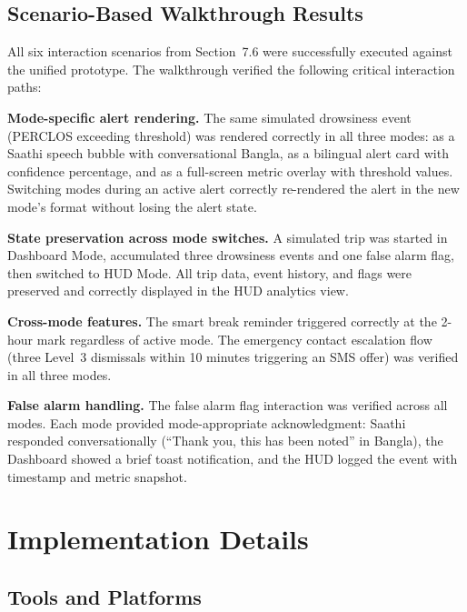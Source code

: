 \documentclass[sigconf]{acmart}
\begin{document}
\subsection{Scenario-Based Walkthrough Results}

All six interaction scenarios from Section~7.6 were successfully executed against the unified prototype. The walkthrough verified the following critical interaction paths:

\textbf{Mode-specific alert rendering.} The same simulated drowsiness event (PERCLOS exceeding threshold) was rendered correctly in all three modes: as a Saathi speech bubble with conversational Bangla, as a bilingual alert card with confidence percentage, and as a full-screen metric overlay with threshold values. Switching modes during an active alert correctly re-rendered the alert in the new mode's format without losing the alert state.

\textbf{State preservation across mode switches.} A simulated trip was started in Dashboard Mode, accumulated three drowsiness events and one false alarm flag, then switched to HUD Mode. All trip data, event history, and flags were preserved and correctly displayed in the HUD analytics view.

\textbf{Cross-mode features.} The smart break reminder triggered correctly at the 2-hour mark regardless of active mode. The emergency contact escalation flow (three Level~3 dismissals within 10 minutes triggering an SMS offer) was verified in all three modes.

\textbf{False alarm handling.} The false alarm flag interaction was verified across all modes. Each mode provided mode-appropriate acknowledgment: Saathi responded conversationally (``Thank you, this has been noted'' in Bangla), the Dashboard showed a brief toast notification, and the HUD logged the event with timestamp and metric snapshot.


\section{Implementation Details}

\subsection{Tools and Platforms}
\end{document}
